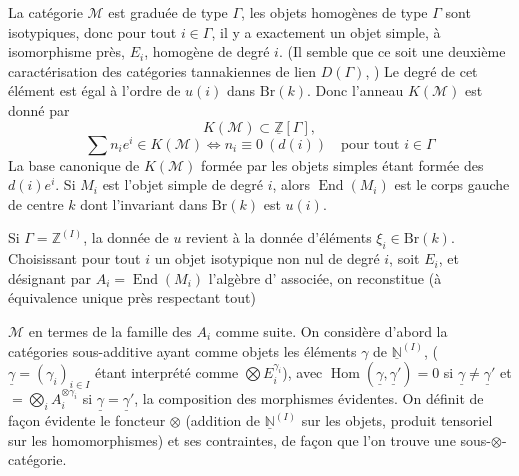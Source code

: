 \documentclass[11pt,a4paper]{article}
\begin{document}
 La catégorie $\mathcal{M}$ est graduée de type $\Gamma$,
les objets homogènes de type $\Gamma$ sont  isotypiques,
donc pour tout $i \in \Gamma$, il y a exactement un objet simple, à
isomorphisme près, $E_{i}$,  homogène de degré $i$. (Il semble
que ce soit une deuxième caractérisation des catégories tannakiennes de
lien $D(\Gamma)$, ) Le degré de cet élément est égal à l'ordre
 de $u(i)$ dans $\mathrm{Br}(k)$. Donc l'anneau
$K(\mathcal{M})$ est donné par
\[
K(\mathcal{M}) \subset \underline{\mathbb{Z}}[\Gamma] ,
\]
\[
\sum n_{i} e^{i} \in K(\mathcal{M}) \iff n_{i} \equiv 0 \ (d(i))
\quad \text{pour tout } i \in \Gamma
\]
La base canonique de $K(\mathcal{M})$ formée par les objets simples étant
formée des $d(i) e^{i}$. Si $M_{i}$ est l'objet simple de 
degré $i$, alors $\operatorname{End}(M_{i})$ est le corps gauche
\struck{\ill{}} de centre $k$ dont l'invariant dans $\mathrm{Br}(k)$ est
$u(i)$.


Si $\Gamma = \mathbb{Z}^{(I)}$, la donnée de $u$ revient à la donnée
d'éléments $\xi_{i} \in \mathrm{Br}(k)$. Choisissant pour tout $i$ un objet
isotypique non nul de degré $i$, soit $E_{i}$, et désignant par
$A_{i} = \operatorname{End}(M_{i})$ l'algèbre d'
 associée, on reconstitue (à équivalence unique
près respectant tout)

$\mathcal{M}$ en termes de la famille des $A_{i}$ \struck{\ill{}} comme
suite. On considère d'abord la catégories sous-additive
 ayant comme objets les éléments $\gamma$ de
$\underline{\mathbb{N}}^{(I)}$, ($\underline{\gamma} =
(\gamma_{i})_{i \in I}$ étant interprété comme
$\bigotimes E_{i}^{\gamma_{i}}$),  avec
$\operatorname{Hom}(\underline{\gamma}, \underline{\gamma}') = 0$ si
$\underline{\gamma} \neq \underline{\gamma}'$ et
$= \bigotimes_{i} A_{i}^{\otimes \gamma_{i}}$ si
$\underline{\gamma} = \underline{\gamma}'$, la composition des morphismes
évidentes. On définit de façon évidente le foncteur $\otimes$ (addition de
$\underline{\mathbb{N}}^{(I)}$ sur les objets, produit tensoriel sur les
homomorphismes) et ses contraintes, de façon que l'on trouve une
sous-$\otimes$-catégorie.
\end{document}
